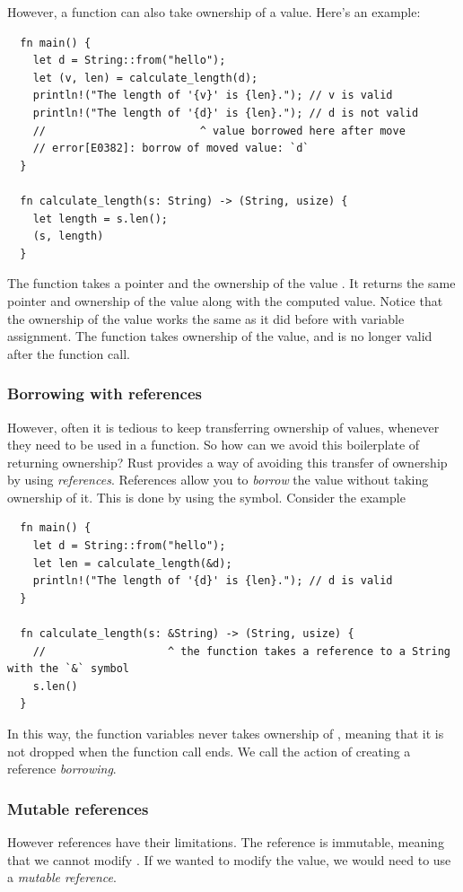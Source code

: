 \documentclass[11pt]{report}
\theoremstyle{definition}
\theoremstyle{plain}
\begin{document}
However, a function can also take ownership of a value. Here's an example:
\begin{verbatim}
  fn main() {
    let d = String::from("hello");
    let (v, len) = calculate_length(d);
    println!("The length of '{v}' is {len}."); // v is valid
    println!("The length of '{d}' is {len}."); // d is not valid
    //                        ^ value borrowed here after move
    // error[E0382]: borrow of moved value: `d`
  }

  fn calculate_length(s: String) -> (String, usize) {
    let length = s.len();
    (s, length)
  }
\end{verbatim}
The function  takes a pointer and the ownership of the  value . It returns the same pointer and ownership of the value along with the computed value. Notice that the ownership of the value works the same as it did before with variable assignment. The function  takes ownership of the value, and  is no longer valid after the function call.


\subsubsection{Borrowing with references}
However, often it is tedious to keep transferring ownership of values, whenever they need to be used in a function. So how can we avoid this boilerplate of returning ownership? Rust provides a way of avoiding this transfer of ownership by using \textit{references}. References allow you to \textit{borrow} the value without taking ownership of it. This is done by using the \rust{&} symbol. Consider the example
\begin{verbatim}
  fn main() {
    let d = String::from("hello");
    let len = calculate_length(&d);
    println!("The length of '{d}' is {len}."); // d is valid
  }

  fn calculate_length(s: &String) -> (String, usize) {
    //                   ^ the function takes a reference to a String with the `&` symbol
    s.len()
  }
\end{verbatim}

In this way, the function variables  never takes ownership of , meaning that it is not dropped when the function call ends. We call the action of creating a reference \textit{borrowing}.

\subsubsection{Mutable references}
However references have their limitations. The reference is immutable, meaning that we cannot modify . If we wanted to modify the value, we would need to use a \textit{mutable reference}.
\end{document}

